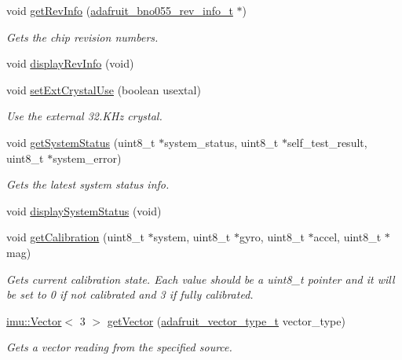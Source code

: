 \begin{DoxyCompactItemize}
void \hyperlink{classAdafruit__BNO055_ab0754eee135fdd3f952d9d2df3dfbf7a}{get\+Rev\+Info} (\hyperlink{structAdafruit__BNO055_1_1adafruit__bno055__rev__info__t}{adafruit\+\_\+bno055\+\_\+rev\+\_\+info\+\_\+t} $\ast$)
\begin{DoxyCompactList}\small\item\em Gets the chip revision numbers. \end{DoxyCompactList}\item 
void \hyperlink{classAdafruit__BNO055_ab243d2116594eb63ac85d4187a2aed6a}{display\+Rev\+Info} (void)
\item 
void \hyperlink{classAdafruit__BNO055_a88343dd2f31190dfbb8dcea569e5ed97}{set\+Ext\+Crystal\+Use} (boolean usextal)
\begin{DoxyCompactList}\small\item\em Use the external 32.\+K\+Hz crystal. \end{DoxyCompactList}\item 
void \hyperlink{classAdafruit__BNO055_aa8b5c135d6b1e654066c24062ddf79b0}{get\+System\+Status} (uint8\+\_\+t $\ast$system\+\_\+status, uint8\+\_\+t $\ast$self\+\_\+test\+\_\+result, uint8\+\_\+t $\ast$system\+\_\+error)
\begin{DoxyCompactList}\small\item\em Gets the latest system status info. \end{DoxyCompactList}\item 
void \hyperlink{classAdafruit__BNO055_a535fe4ebfbea4509dae60ab5644baf72}{display\+System\+Status} (void)
\item 
void \hyperlink{classAdafruit__BNO055_a34cb7b7421d4d9597ccfc31470c2c3f7}{get\+Calibration} (uint8\+\_\+t $\ast$system, uint8\+\_\+t $\ast$gyro, uint8\+\_\+t $\ast$accel, uint8\+\_\+t $\ast$mag)
\begin{DoxyCompactList}\small\item\em Gets current calibration state. Each value should be a uint8\+\_\+t pointer and it will be set to 0 if not calibrated and 3 if fully calibrated. \end{DoxyCompactList}\item 
\hyperlink{classimu_1_1Vector}{imu\+::\+Vector}$<$ 3 $>$ \hyperlink{classAdafruit__BNO055_aa352ee195ee844ba5c1ba61b010e4517}{get\+Vector} (\hyperlink{classAdafruit__BNO055_aca6c5acffc9a752e5309ff2bb21f3e25}{adafruit\+\_\+vector\+\_\+type\+\_\+t} vector\+\_\+type)
\begin{DoxyCompactList}\small\item\em Gets a vector reading from the specified source. \end{DoxyCompactList}\item 

\end{DoxyCompactItemize}
